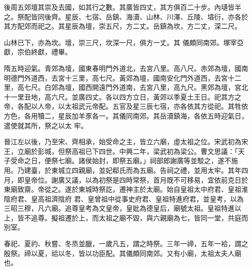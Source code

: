 \begin{pinyinscope}
 後周五郊壇其崇及去國，如其行之數。其廣皆四丈，其方俱百二十步。內壝皆半之。祭配皆同後齊。星辰、七宿、岳鎮、海瀆、山林、川澤、丘陵、墳衍，亦各於其方配郊而祀之。其星辰為壇，崇五尺，方二丈。岳鎮為坎，方二丈，深二尺。



 山林已下，亦為坎。壇，崇三尺，坎深一尺，俱方一丈。其
 儀頗同南郊。塚宰亞獻，宗伯終獻，禮畢。



 隋五時迎氣。青郊為壇，國東春明門外道北，去宮八里。高八尺。赤郊為壇，國南明德門外道西，去宮十三里，高七尺。黃郊為壇，國南安化門外道西，去宮十二里，高七尺。白郊為壇，國西開遠門外道南，去宮八里，高九尺。黑郊為壇，宮北十一里丑地，高六尺。並廣四丈。各以四方立日，黃郊以季夏土王日。祀其方之帝，各配以人帝，以太祖武元帝配。五官及星三辰七宿，亦各依其方從祀。其牲依方色，各用犢二，星辰加羊豕各一。其儀同南郊。其岳瀆鎮海，各依五時迎氣日，遣使就其所，祭之以太
 牢。



 晉江左以後，乃至宋、齊相承，始受命之主，皆立六廟，虛太祖之位。宋武初為宋王，立廟於彭城，但祭高祖已下四世。中興二年，梁武初為梁公。曹文思議：「天子受命之日，便祭七廟。諸侯始封，即祭五廟。」祠部郎謝廣等並駁之，遂不施用。乃建臺，於東城立四親廟，並妃郗氏而為五廟。告祠之禮，並用太牢。其年四月，即皇帝位。謝廣又議，以為初祭是四時常祭，首月既不可移易，宜依前克日於東廟致齋。帝從之。遂於東城時祭訖，遷神主於太廟。始自皇祖太中府君、皇祖淮陰府君、皇高祖濟陰府
 君、皇曾祖中從事史府君、皇祖特進府君，並皇考，以為三昭三穆，凡六廟。追尊皇考為文皇帝，皇妣為德皇后，廟號太祖。皇祖特進以上，皆不追尊。擬祖遷於上，而太祖之廟不毀，與六親廟為七，皆同一堂，共庭而別室。



 春祀、夏礿、秋嘗、冬烝並臘，一歲凡五，謂之時祭。三年一禘，五年一袷，謂之殷祭。禘以夏，祫以冬，皆以功臣配。其儀頗同南郊。又有小廟，太祖太夫人廟也。




\end{pinyinscope}

